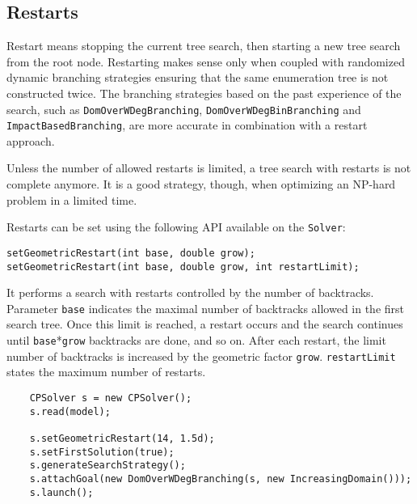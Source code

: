 \subsection{Restarts}\label{solver:restarts}\hypertarget{solver:restarts}{}

Restart means stopping the current tree search, then starting a new tree search from the root node.
Restarting makes sense only when coupled with randomized dynamic branching strategies ensuring that the same enumeration tree is not constructed twice. The branching strategies based on the past experience of the search, such as \texttt{DomOverWDegBranching}, \texttt{DomOverWDegBinBranching} and \texttt{ImpactBasedBranching}, are more accurate in combination with a restart approach.

Unless the number of allowed restarts is limited, a tree search with restarts is not complete anymore. It is a good strategy, though, when optimizing an NP-hard problem in a limited time.


Restarts can be set using the following API available on the \texttt{Solver}:
\begin{lstlisting}
setGeometricRestart(int base, double grow);
setGeometricRestart(int base, double grow, int restartLimit);
\end{lstlisting}
It performs a search with restarts controlled by the number of backtracks. 
Parameter \texttt{base} indicates the maximal number of backtracks allowed in the first search tree. Once this limit is reached, a restart occurs and the search continues until \texttt{base}*\texttt{grow} backtracks are done, and so on. After each restart, the limit number of backtracks is increased by the geometric factor \texttt{grow}. 
\texttt{restartLimit} states the maximum number of restarts.
\begin{lstlisting}
	CPSolver s = new CPSolver();
	s.read(model);
	
	s.setGeometricRestart(14, 1.5d);
	s.setFirstSolution(true);
	s.generateSearchStrategy();
	s.attachGoal(new DomOverWDegBranching(s, new IncreasingDomain()));
	s.launch();
\end{lstlisting}

